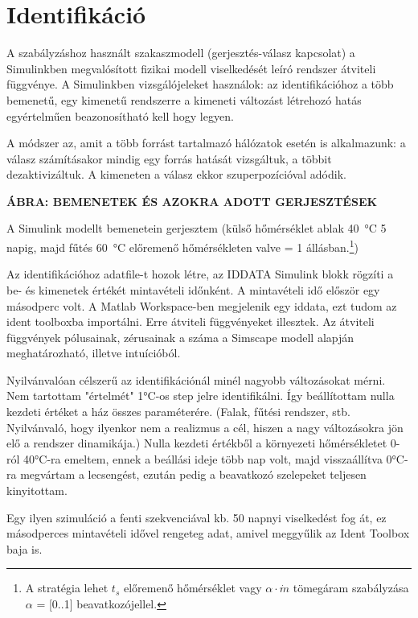 \chapter{Identifikáció}


A szabályzáshoz használt szakaszmodell (gerjesztés-válasz kapcsolat) a Simulinkben megvalósított fizikai modell viselkedését leíró rendszer átviteli függvénye. A Simulinkben vizsgálójeleket használok: az identifikációhoz a több bemenetű, egy kimenetű rendszerre a kimeneti változást létrehozó hatás egyértelműen beazonosítható kell hogy legyen.

A módszer az, amit a több forrást tartalmazó hálózatok esetén is alkalmazunk: a válasz számításakor mindig egy forrás hatását vizsgáltuk, a többit dezaktivizáltuk. A kimeneten a válasz ekkor szuperpozícióval adódik. 

\textbf{ÁBRA: BEMENETEK ÉS AZOKRA ADOTT GERJESZTÉSEK}

A Simulink modellt bemenetein gerjesztem (külső hőmérséklet ablak \SI{40}{\celsius} 5 napig, majd fűtés \SI{60}{\celsius} előremenő hőmérsékleten valve = 1 állásban.\footnote{A stratégia lehet $t_s$ előremenő hőmérséklet vagy $\alpha \cdot \dot m$ tömegáram szabályzása $\alpha$ = [0..1] beavatkozójellel. })


Az identifikációhoz adatfile-t hozok létre, az IDDATA Simulink blokk rögzíti a be- és kimenetek értékét mintavételi időnként. A mintavételi idő először egy másodperc volt. A Matlab Workspace-ben megjelenik egy iddata, ezt tudom az ident toolboxba importálni. Erre átviteli függvényeket illesztek. Az átviteli függvények pólusainak, zérusainak a száma a Simscape modell alapján meghatározható, illetve intuícióból.

Nyilvánvalóan célszerű az identifikációnál minél nagyobb változásokat mérni. Nem tartottam "értelmét" 1\si{\celsius}-os step jelre identifikálni. Így beállítottam nulla kezdeti értéket a ház összes paraméterére. (Falak, fűtési rendszer, stb. Nyilvánvaló, hogy ilyenkor nem a realizmus a cél, hiszen a nagy változásokra jön elő a rendszer dinamikája.) Nulla kezdeti értékből a környezeti hőmérsékletet 0-ról 40\si{\celsius}-ra emeltem, ennek a beállási ideje több nap volt, majd visszaállítva 0\si{\celsius}-ra megvártam a lecsengést, ezután pedig a beavatkozó szelepeket teljesen kinyitottam. 

Egy ilyen szimuláció a fenti szekvenciával kb. 50 napnyi viselkedést fog át, ez másodperces mintavételi idővel rengeteg adat, amivel meggyűlik az Ident Toolbox baja is.

